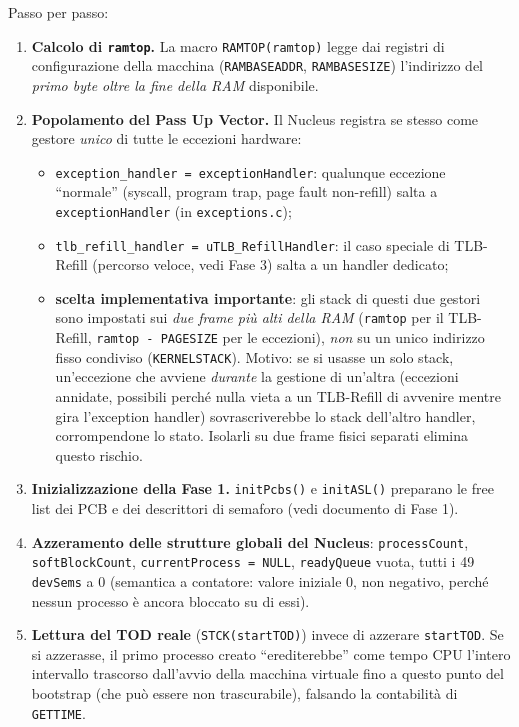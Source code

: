 \documentclass[11pt,a4paper]{article}
\newcommand{\code}[1]{\texttt{#1}}
\begin{document}
Passo per passo:

\begin{enumerate}
\item \textbf{Calcolo di \code{ramtop}.} La macro \code{RAMTOP(ramtop)}
  legge dai registri di configurazione della macchina (\code{RAMBASEADDR},
  \code{RAMBASESIZE}) l'indirizzo del \emph{primo byte oltre la fine della
  RAM} disponibile.

\item \textbf{Popolamento del Pass Up Vector.} Il Nucleus registra se stesso
  come gestore \emph{unico} di tutte le eccezioni hardware:
  \begin{itemize}
  \item \code{exception\_handler = exceptionHandler}: qualunque eccezione
    ``normale'' (syscall, program trap, page fault non-refill) salta a
    \code{exceptionHandler} (in \code{exceptions.c});
  \item \code{tlb\_refill\_handler = uTLB\_RefillHandler}: il caso speciale
    di TLB-Refill (percorso veloce, vedi Fase 3) salta a un handler
    dedicato;
  \item \textbf{scelta implementativa importante}: gli stack di questi due
    gestori sono impostati sui \emph{due frame più alti della RAM}
    (\code{ramtop} per il TLB-Refill, \code{ramtop - PAGESIZE} per le
    eccezioni), \emph{non} su un unico indirizzo fisso condiviso
    (\code{KERNELSTACK}). Motivo: se si usasse un solo stack, un'eccezione
    che avviene \emph{durante} la gestione di un'altra (eccezioni annidate,
    possibili perché nulla vieta a un TLB-Refill di avvenire mentre gira
    l'exception handler) sovrascriverebbe lo stack dell'altro handler,
    corrompendone lo stato. Isolarli su due frame fisici separati elimina
    questo rischio.
  \end{itemize}

\item \textbf{Inizializzazione della Fase 1.} \code{initPcbs()} e
  \code{initASL()} preparano le free list dei PCB e dei descrittori di
  semaforo (vedi documento di Fase 1).

\item \textbf{Azzeramento delle strutture globali del Nucleus}:
  \code{processCount}, \code{softBlockCount}, \code{currentProcess = NULL},
  \code{readyQueue} vuota, tutti i 49 \code{devSems} a 0 (semantica a
  contatore: valore iniziale 0, non negativo, perché nessun processo è
  ancora bloccato su di essi).

\item \textbf{Lettura del TOD reale} (\code{STCK(startTOD)}) invece di
  azzerare \code{startTOD}. Se si azzerasse, il primo processo creato
  ``erediterebbe'' come tempo CPU l'intero intervallo trascorso dall'avvio
  della macchina virtuale fino a questo punto del bootstrap (che può essere
  non trascurabile), falsando la contabilità di \code{GETTIME}.


\end{enumerate}
\end{document}
